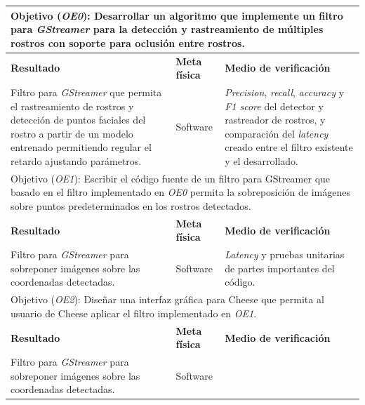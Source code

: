 \documentclass[a4paper,openright,12pt]{report}
\begin{document}
\begin{center}
  \begin{longtable}{| p{.4\linewidth} | p{.2\linewidth} | p{.3\linewidth} |}
  \hline

  \multicolumn{3}{|p{\linewidth}|}{Objetivo (\textit{OE0}): Desarrollar un algoritmo que
  implemente un filtro para \textit{GStreamer} para la detección y rastreamiento
  de múltiples rostros con soporte para oclusión entre rostros.}
  \\ \hline

  \textbf{Resultado} &
  \textbf{Meta física} &
  \textbf{Medio de verificación}
  \\ \hline

  Filtro para \textit{GStreamer} que permita el rastreamiento de rostros y
  detección de puntos faciales del rostro a partir de un modelo entrenado 
  permitiendo regular el retardo ajustando parámetros. &
  Software &
  \textit{Precision}, \textit{recall}, \textit{accuracy} y
  \textit{F1 score} del detector y rastreador de rostros, y comparación del
  \textit{latency} creado entre el filtro existente y el desarrollado.
  \\ \hline

  \multicolumn{3}{|p{\linewidth}|}{Objetivo (\textit{OE1}): Escribir el código
  fuente de un filtro para GStreamer que basado en el filtro implementado en
  \textit{OE0} permita la sobreposición de imágenes sobre puntos predeterminados
  en los rostros detectados.}
  \\ \hline

  \textbf{Resultado} &
  \textbf{Meta física} &
  \textbf{Medio de verificación}
  \\ \hline

  Filtro para \textit{GStreamer} para sobreponer imágenes sobre las coordenadas
  detectadas. &
  Software &
  \textit{Latency} y pruebas unitarias de partes importantes del código.
  \\ \hline

  \multicolumn{3}{|p{\linewidth}|}{Objetivo (\textit{OE2}): Diseñar una interfaz
  gráfica para Cheese que permita al usuario de Cheese aplicar el filtro
  implementado en \textit{OE1}.}
  \\ \hline

  \textbf{Resultado} &
  \textbf{Meta física} &
  \textbf{Medio de verificación}
  \\ \hline

  Filtro para \textit{GStreamer} para sobreponer imágenes sobre las coordenadas
  detectadas. &
  Software
  \\ \hline
  \end{longtable}
\end{center}
\end{document}
